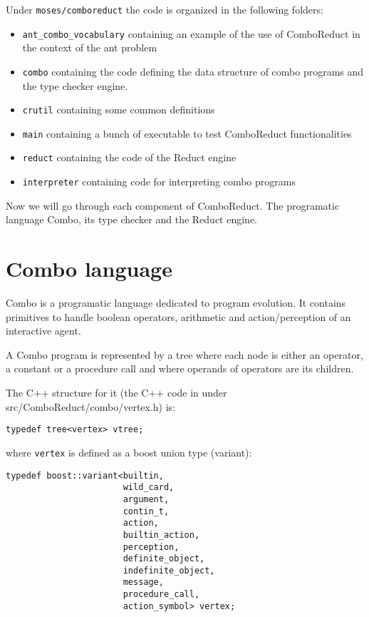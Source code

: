 \documentclass{article}
\begin{document}
  Under \verb|moses/comboreduct| the code is organized in the following
  folders:
  \begin{itemize}
  \item \verb|ant_combo_vocabulary| containing an example of the use of
    ComboReduct in the context of the ant problem
  \item \verb|combo| containing the code defining the data structure
    of combo programs and the type checker engine.
  \item \verb|crutil| containing some common definitions
  \item \verb|main| containing a bunch of executable to test ComboReduct
    functionalities
  \item \verb|reduct| containing the code of the Reduct engine
  \item \verb|interpreter| containing code for interpreting combo programs
  \end{itemize}

  Now we will go through each component of ComboReduct. The programatic language Combo, its type checker and the Reduct engine.
    
  \section{Combo language}
  
  Combo is a programatic language dedicated to program evolution.
  It contains primitives to handle boolean operators, arithmetic and
  action/perception of an interactive agent.
  
  A Combo program is represented by a tree where each node is either an
  operator, a constant or a procedure call and where operands of operators are
  its children.

  The C++ structure for it (the C++ code in under src/ComboReduct/combo/vertex.h)
  is:

  \begin{verbatim}
typedef tree<vertex> vtree;
  \end{verbatim}
  
  where \verb|vertex| is defined as a boost union type (variant):
  
  \begin{verbatim}
typedef boost::variant<builtin,
                       wild_card,
                       argument,
                       contin_t,
                       action,
                       builtin_action,
                       perception,
                       definite_object,
                       indefinite_object,
                       message,
                       procedure_call,
                       action_symbol> vertex;
  \end{verbatim}
\end{document}
